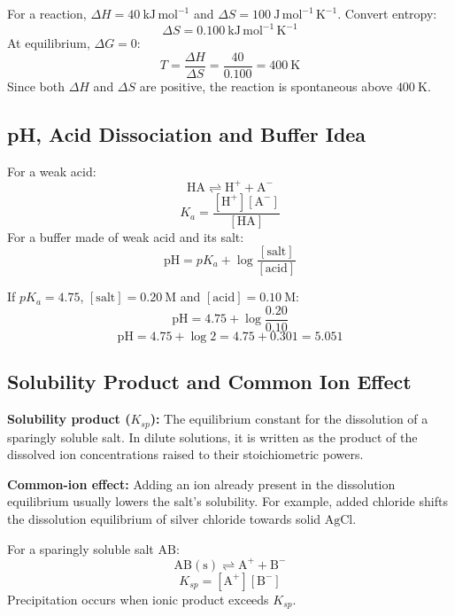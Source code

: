 \documentclass[12pt,a4paper]{article}
\begin{document}
\begin{tcolorbox}[examplebox, title={Solved Example: Temperature of Spontaneity}]
For a reaction, $\Delta H=40\ \mathrm{kJ\,mol^{-1}}$ and $\Delta S=100\ \mathrm{J\,mol^{-1}\,K^{-1}}$.
Convert entropy:
\[
\Delta S=0.100\ \mathrm{kJ\,mol^{-1}\,K^{-1}}
\]
At equilibrium, $\Delta G=0$:
\[
T=\frac{\Delta H}{\Delta S}=\frac{40}{0.100}=400\ \mathrm{K}
\]
Since both $\Delta H$ and $\Delta S$ are positive, the reaction is spontaneous above $400\ \mathrm{K}$.
\end{tcolorbox}

\subsection{pH, Acid Dissociation and Buffer Idea}
For a weak acid:
\[
\mathrm{HA\rightleftharpoons H^+ + A^-}
\]
\[
K_a=\frac{[\mathrm{H^+}][\mathrm{A^-}]}{[\mathrm{HA}]}
\]
For a buffer made of weak acid and its salt:
\[
\mathrm{pH}=pK_a+\log\frac{[\mathrm{salt}]}{[\mathrm{acid}]}
\]

\begin{tcolorbox}[examplebox, title={Solved Example: Buffer pH}]
If $pK_a=4.75$, $[\mathrm{salt}]=0.20\ \mathrm{M}$ and $[\mathrm{acid}]=0.10\ \mathrm{M}$:
\[
\mathrm{pH}=4.75+\log\frac{0.20}{0.10}
\]
\[
\mathrm{pH}=4.75+\log2=4.75+0.301=5.051
\]
\end{tcolorbox}

\subsection{Solubility Product and Common Ion Effect}
\begin{tcolorbox}[defbox, title={Solubility Product and Common Ion Effect}]
\textbf{Solubility product ($K_{sp}$):} The equilibrium constant for the dissolution of a sparingly soluble salt. In dilute solutions, it is written as the product of the dissolved ion concentrations raised to their stoichiometric powers.

\textbf{Common-ion effect:} Adding an ion already present in the dissolution equilibrium usually lowers the salt's solubility. For example, added chloride shifts the dissolution equilibrium of silver chloride towards solid $\mathrm{AgCl}$.
\end{tcolorbox}

For a sparingly soluble salt $\mathrm{AB}$:
\[
\mathrm{AB(s)\rightleftharpoons A^+ + B^-}
\]
\[
K_{sp}=[\mathrm{A^+}][\mathrm{B^-}]
\]
Precipitation occurs when ionic product exceeds $K_{sp}$.
\end{document}
